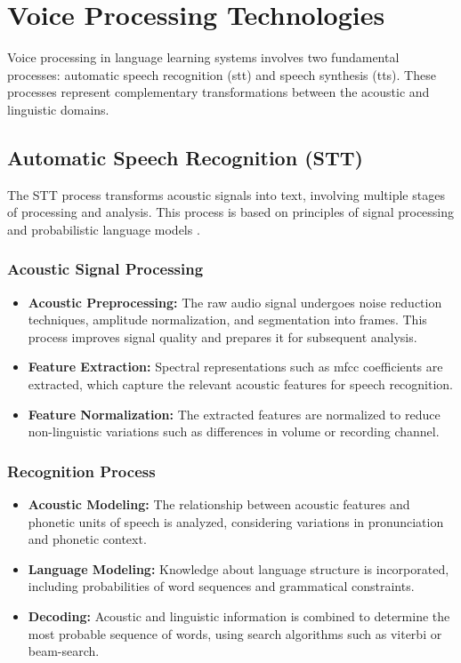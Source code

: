 \section{Voice Processing Technologies}

Voice processing in language learning systems involves two fundamental processes: automatic speech recognition (\gls{stt}) and speech synthesis (\gls{tts}). These processes represent complementary transformations between the acoustic and linguistic domains.

\subsection{Automatic Speech Recognition (STT)}

The STT process transforms acoustic signals into text, involving multiple stages of processing and analysis. This process is based on principles of signal processing and probabilistic language models \cite{graves2013speech}.

\subsubsection{Acoustic Signal Processing}

\begin{itemize}
  \item \textbf{Acoustic Preprocessing:} The raw audio signal undergoes noise reduction techniques, amplitude normalization, and segmentation into frames. This process improves signal quality and prepares it for subsequent analysis.

  \item \textbf{Feature Extraction:} Spectral representations such as \gls{mfcc} coefficients are extracted, which capture the relevant acoustic features for speech recognition.

  \item \textbf{Feature Normalization:} The extracted features are normalized to reduce non-linguistic variations such as differences in volume or recording channel.
\end{itemize}

\subsubsection{Recognition Process}

\begin{itemize}
  \item \textbf{Acoustic Modeling:} The relationship between acoustic features and phonetic units of speech is analyzed, considering variations in pronunciation and phonetic context.

  \item \textbf{Language Modeling:} Knowledge about language structure is incorporated, including probabilities of word sequences and grammatical constraints.

  \item \textbf{Decoding:} Acoustic and linguistic information is combined to determine the most probable sequence of words, using search algorithms such as \gls{viterbi} or \gls{beam-search}.
\end{itemize}

